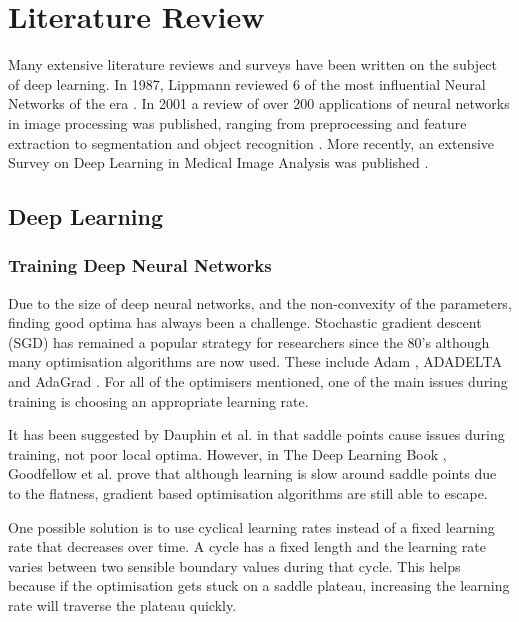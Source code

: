 
\chapter{Literature Review}\label{cha:literature}

Many extensive literature reviews and surveys have been written on the subject of deep learning.
In 1987, Lippmann reviewed 6 of the most influential Neural Networks of the era \cite{Lippmann_1987}.
In 2001 a review of over 200 applications of neural networks in image processing was published, ranging from preprocessing and feature extraction to segmentation and object recognition \cite{Egmont-Petersen_de_Ridder_Handels_2002}.
More recently, an extensive Survey on Deep Learning in Medical Image Analysis was published \cite{Litjens_Kooi_Bejnordi_Setio_Ciompi_Ghafoorian_van_der_Laak_van_Ginneken_Sanchez_2017}.


\section{Deep Learning}\label{sec:deep_learning_lit}

\subsection{Training Deep Neural Networks}\label{subsec:training}
Due to the size of deep neural networks, and the non-convexity of the parameters, finding good optima has always been a challenge.
Stochastic gradient descent (SGD) has remained a popular strategy for researchers since the 80's although many optimisation algorithms are now used.
These include Adam \cite{Kingma_Ba_2014}, ADADELTA \cite{Zeiler_2012} and AdaGrad \cite{Duchi_Hazan_Singer_2011}.
For all of the optimisers mentioned, one of the main issues during training is choosing an appropriate learning rate.

It has been suggested by Dauphin et al. in \cite{Dauphin_de_Vries_Bengio_2015} that saddle points cause issues during training, not poor local optima.
However, in The Deep Learning Book \cite{Goodfellow-et-al-2016}, Goodfellow et al. prove that although learning is slow around saddle points due to the flatness, gradient based optimisation algorithms are still able to escape.

One possible solution is to use cyclical learning rates instead of a fixed learning rate that decreases over time.
A cycle has a fixed length and the learning rate varies between two sensible boundary values during that cycle.
This helps because if the optimisation gets stuck on a saddle plateau, increasing the learning rate will traverse the plateau quickly.

